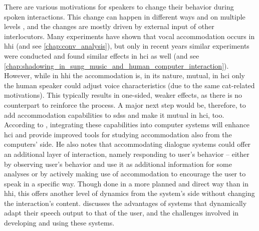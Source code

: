 There are various motivations for speakers to change their behavior during spoken interactions.
This change can happen in different ways and on multiple levels \citep[][and see \cref{chap:phonetic_convergence} for more details]{Gallois2015CAT, Shepard2001CAT}, and the changes are mostly driven by external input of other interlocutors.
Many experiments have shown that vocal accommodation occurs in \ac{hhi} (and see \cref{chap:conv_analysis}), but only in recent years similar experiments were conducted and found similar effects in \ac{hci} as well (and see \cref{chap:shadowing_in_sung_music_and_human_computer_interaction}).
However, while in \ac{hhi} the accommodation is, in its nature, mutual, in \ac{hci} only the human speaker could adjust voice characteristics (due to the same \ac{cat}-related motivations).
This typically results in one-sided, weaker effects, as there is no counterpart to reinforce the process.
A major next step would be, therefore, to add accommodation capabilities to \acp{sds} and make it mutual in \ac{hci}, too.
According to \citet{Weise2017towards}, integrating these capabilities into computer systems will enhance \ac{hci} and provide improved tools for studying accommodation also from the computers' side.
He also notes that accommodating dialogue systems could offer an additional layer of interaction, namely responding to user's behavior -- either by observing user's behavior and use it as additional information for some analyses or by actively making use of accommodation to encourage the user to speak in a specific way.
Though done in a more planned and direct way than in \ac{hhi}, this offers another level of dynamics from the system's side without changing the interaction's content.
\citet{Oviatt2004adaptive} discusses the advantages of systems that dynamically adapt their speech output to that of the user, and the challenges involved in developing and using these systems.

